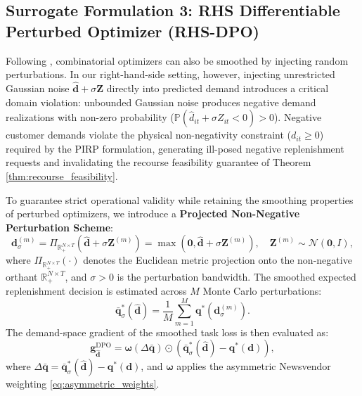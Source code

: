 \documentclass[11pt,a4paper]{article}
\theoremstyle{definition}
\theoremstyle{remark}
\begin{document}
\subsection{Surrogate Formulation 3: RHS Differentiable Perturbed Optimizer (RHS-DPO)}
\label{sec:dpo}
Following \citet{berthet2020learning}, combinatorial optimizers can also be smoothed by injecting random perturbations. In our right-hand-side setting, however, injecting unrestricted Gaussian noise $\hat{\mathbf{d}} + \sigma \mathbf{Z}$ directly into predicted demand introduces a critical domain violation: unbounded Gaussian noise produces negative demand realizations with non-zero probability ($\mathbb{P}(\hat{d}_{it} + \sigma Z_{it} < 0) > 0$). Negative customer demands violate the physical non-negativity constraint ($d_{it} \ge 0$) required by the PIRP formulation, generating ill-posed negative replenishment requests and invalidating the recourse feasibility guarantee of Theorem \ref{thm:recourse_feasibility}.

To guarantee strict operational validity while retaining the smoothing properties of perturbed optimizers, we introduce a \textbf{Projected Non-Negative Perturbation Scheme}:
\begin{equation}
    \mathbf{d}_\sigma^{(m)} = \Pi_{\mathbb{R}_+^{N \times T}}\left(\hat{\mathbf{d}} + \sigma \mathbf{Z}^{(m)}\right) = \max\left(\mathbf{0}, \hat{\mathbf{d}} + \sigma \mathbf{Z}^{(m)}\right), \quad \mathbf{Z}^{(m)} \sim \mathcal{N}(\mathbf{0}, I), \label{eq:projected_dpo}
\end{equation}
where $\Pi_{\mathbb{R}_+^{N \times T}}(\cdot)$ denotes the Euclidean metric projection onto the non-negative orthant $\mathbb{R}_+^{N \times T}$, and $\sigma > 0$ is the perturbation bandwidth. The smoothed expected replenishment decision is estimated across $M$ Monte Carlo perturbations:
\begin{equation*}
    \bar{\mathbf{q}}_\sigma^*(\hat{\mathbf{d}}) = \frac{1}{M} \sum_{m=1}^M \mathbf{q}^*\left(\mathbf{d}_\sigma^{(m)}\right).
\end{equation*}
The demand-space gradient of the smoothed task loss is then evaluated as:
\begin{equation}
    \mathbf{g}_{\hat{\mathbf{d}}}^{\text{DPO}} = \boldsymbol{\omega}(\Delta \bar{\mathbf{q}}) \odot \left( \bar{\mathbf{q}}_\sigma^*(\hat{\mathbf{d}}) - \mathbf{q}^*(\mathbf{d}) \right), \label{eq:dpo_gradient}
\end{equation}
where $\Delta \bar{\mathbf{q}} = \bar{\mathbf{q}}_\sigma^*(\hat{\mathbf{d}}) - \mathbf{q}^*(\mathbf{d})$, and $\boldsymbol{\omega}$ applies the asymmetric Newsvendor weighting \eqref{eq:asymmetric_weights}.
\end{document}
